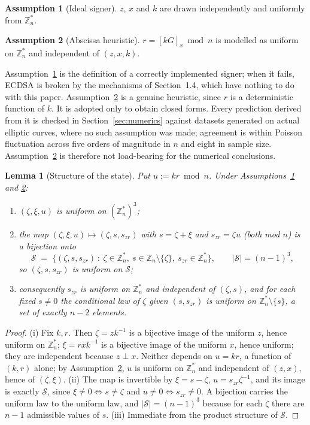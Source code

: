 \documentclass[11pt,a4paper]{article}
\theoremstyle{plain}
\newtheorem{lemma}[theorem]{Lemma}
\theoremstyle{definition}
\newtheorem{assumption}{Assumption}
\theoremstyle{remark}
\newcommand{\Zs}{\mathbb{Z}_n^{*}}
\newcommand{\szr}{s_{zr}}
\begin{document}
\begin{assumption}[Ideal signer]\label{as:U}
$z$, $x$ and $k$ are drawn independently and uniformly from $\Zs$.
\end{assumption}

\begin{assumption}[Abscissa heuristic]\label{as:R}
$r = [kG]_x \bmod n$ is modelled as uniform on $\Zs$ and independent of $(z,x,k)$.
\end{assumption}

Assumption~\ref{as:U} is the definition of a correctly implemented signer; when it fails, ECDSA
is broken by the mechanisms of Section~1.4, which have nothing to do with this paper.
Assumption~\ref{as:R} is a genuine heuristic, since $r$ is a deterministic function of $k$. It is
adopted only to obtain closed forms. Every prediction derived from it is checked in
Section~\ref{sec:numerics} against datasets generated on actual elliptic curves, where no such
assumption was made; agreement is within Poisson fluctuation across five orders of magnitude in
$n$ and eight in sample size. Assumption~\ref{as:R} is therefore not load-bearing for the
numerical conclusions.

\begin{lemma}[Structure of the state]\label{lem:structure}
Put $u := kr \bmod n$. Under Assumptions~\ref{as:U} and \ref{as:R}:
\begin{enumerate}[label=(\roman*),leftmargin=2.2em,itemsep=2pt]
\item $(\zeta,\xi,u)$ is uniform on $(\Zs)^{3}$;
\item the map $(\zeta,\xi,u)\mapsto(\zeta,s,\szr)$ with $s = \zeta+\xi$ and $\szr = \zeta u$
  (both mod $n$) is a bijection onto
  \[
    \mathcal{S} \;=\; \bigl\{(\zeta,s,\szr)\ :\ \zeta\in\Zs,\ s\in\mathbb{Z}_n\setminus\{\zeta\},\
    \szr\in\Zs\bigr\},\qquad |\mathcal{S}| = (n-1)^{3},
  \]
  so $(\zeta,s,\szr)$ is uniform on $\mathcal{S}$;
\item consequently $\szr$ is uniform on $\Zs$ and independent of $(\zeta,s)$, and for each fixed
  $s\neq 0$ the conditional law of $\zeta$ given $(s,\szr)$ is uniform on $\Zs\setminus\{s\}$, a
  set of exactly $n-2$ elements.
\end{enumerate}
\end{lemma}

\begin{proof}
(i) Fix $k,r$. Then $\zeta = zk^{-1}$ is a bijective image of the uniform $z$, hence uniform on
$\Zs$; $\xi = rxk^{-1}$ is a bijective image of the uniform $x$, hence uniform; they are
independent because $z \perp x$. Neither depends on $u = kr$, a function of $(k,r)$ alone; by
Assumption~\ref{as:R}, $u$ is uniform on $\Zs$ and independent of $(z,x)$, hence of $(\zeta,\xi)$.
(ii) The map is invertible by $\xi = s-\zeta$, $u = \szr\zeta^{-1}$, and its image is exactly
$\mathcal{S}$, since $\xi \neq 0 \iff s \neq \zeta$ and $u \neq 0 \iff \szr \neq 0$. A bijection
carries the uniform law to the uniform law, and $|\mathcal{S}| = (n-1)^{3}$ because for each
$\zeta$ there are $n-1$ admissible values of $s$.
(iii) Immediate from the product structure of $\mathcal{S}$.
\end{proof}
\end{document}
